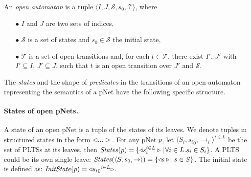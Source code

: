 \documentclass[smallcondensed]{svjour3}
\begin{document}
\begin{definition}
	\label{def:open-automaton}
	An \emph{open automaton} is a tuple $
	\langle I, J,\mathcal{S},s_0,\mathcal{T}\rangle$, where
	\begin{itemize}
		\item[$\bullet$]  $I$ and $J$ are  two sets of indices,
		\item[$\bullet$]  $\mathcal{S}$ is a set of states and $s_0 \in \mathcal{S}$ the initial state,
		\item[$\bullet$] $\mathcal{T}$ is a set of open transitions and, for each
		$t\in \mathcal{T}$, there exist $I'$, $J'$ with $I'\subseteq I$, $J'
		\subseteq J$, such that $t$ is an open transition over $J'$
		and  $\mathcal{S}$.
		
	\end{itemize}
\end{definition}
%

The \emph{states} and the shape of \emph{predicates} in the
transitions
of an open automaton representing the semantics of a pNet
have the following specific structure.

\paragraph{States of open pNets.}\label{def-states}
A state of an open pNet is a tuple of the
states of its leaves. We denote tuples
in structured states in the form $\triangleleft\ldots\triangleright$.
For any pNet $p$, let $\langle S_i,{s_i}_0, \to_i\rangle^{i \in L}$ be the set of PLTSs at its leaves,
then $\mathit{States}(p) = \{\triangleleft{s_i^{i\in L}}\triangleright
|\, \forall i\in L. s_i \in S_i\}$.
A PLTS could be its own single leave:
$\mathit{States}(\langle S,s_0, \to\rangle) = \{\triangleleft{s}\triangleright|\, s \in S\}$.
The initial state is defined as:
$\mathit{InitState}(p) = \triangleleft{{{s_i}_0}^{i\in L}}\triangleright$.


\end{document}

